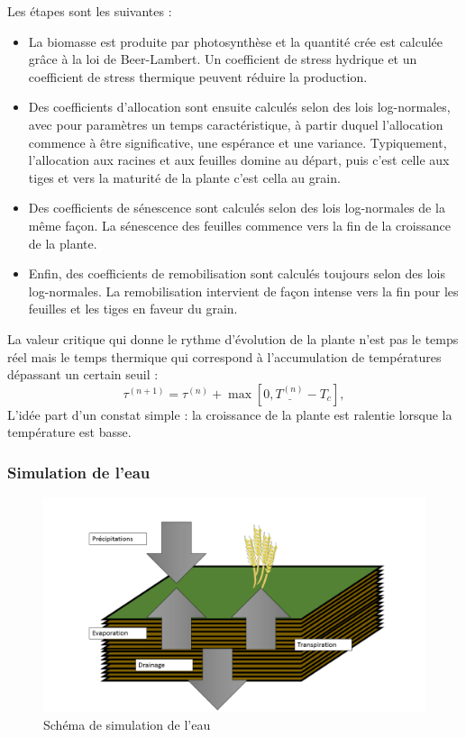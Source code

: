 Les étapes sont les suivantes : 

\begin{itemize}

\item La biomasse est produite par photosynthèse et la quantité crée est calculée grâce à la loi de Beer-Lambert.  Un coefficient de stress hydrique et un coefficient de stress thermique peuvent réduire la production.

\item Des coefficients d'allocation sont ensuite calculés selon des lois log-normales, avec pour paramètres un temps caractéristique, à partir duquel l'allocation commence à être significative, une espérance et une variance. Typiquement, l'allocation aux racines et aux feuilles domine au départ, puis c'est celle aux tiges et vers la maturité de la plante c'est cella au grain.

\item Des coefficients de sénescence sont calculés selon des lois log-normales de la même façon. La sénescence des feuilles commence vers la fin de la croissance de la plante.

\item Enfin, des coefficients de remobilisation sont calculés toujours selon des lois log-normales. La remobilisation intervient de façon intense vers la fin pour les feuilles et les tiges en faveur du grain.

\end{itemize}

La valeur critique qui donne le rythme d'évolution de la plante n'est pas le temps réel mais le temps thermique qui correspond à l'accumulation de températures dépassant un certain seuil :
\[
\tau^{(n+1)} = \tau^{(n)} + \max[0, \underline{T^{(n)}} - T_c], 
\]
L'idée part d'un constat simple : la croissance de la plante est ralentie lorsque la température est basse.

\subsubsection{Simulation de l'eau}

\begin{figure}[H]

\begin{center}
 \includegraphics[scale = 0.42]{./img/waterSchema.png}
 \caption{Schéma de simulation de l'eau}
 \label{fig:waterModel}
\end{center}

\end{figure}

